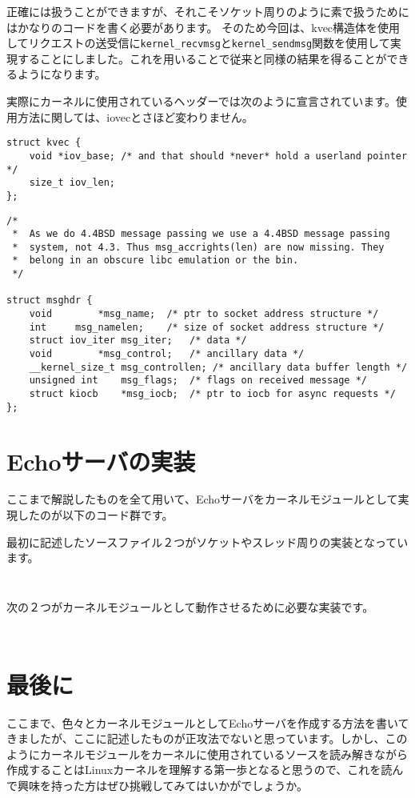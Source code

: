 正確には扱うことができますが、それこそソケット周りのように素で扱うためにはかなりのコードを書く必要があります。
そのため今回は、kvec構造体を使用してリクエストの送受信に\verb|kernel_recvmsg|と\verb|kernel_sendmsg|関数を使用して実現することにしました。これを用いることで従来と同様の結果を得ることができるようになります。

実際にカーネルに使用されているヘッダーでは次のように宣言されています。使用方法に関しては、iovecとさほど変わりません。
\begin{verbatim}
struct kvec {
    void *iov_base; /* and that should *never* hold a userland pointer */
    size_t iov_len;
};
\end{verbatim}
\begin{verbatim}
/*
 *  As we do 4.4BSD message passing we use a 4.4BSD message passing
 *  system, not 4.3. Thus msg_accrights(len) are now missing. They
 *  belong in an obscure libc emulation or the bin.
 */
 
struct msghdr {
    void        *msg_name;  /* ptr to socket address structure */
    int     msg_namelen;    /* size of socket address structure */
    struct iov_iter msg_iter;   /* data */
    void        *msg_control;   /* ancillary data */
    __kernel_size_t msg_controllen; /* ancillary data buffer length */
    unsigned int    msg_flags;  /* flags on received message */
    struct kiocb    *msg_iocb;  /* ptr to iocb for async requests */
};
\end{verbatim}

\section{Echoサーバの実装}
ここまで解説したものを全て用いて、Echoサーバをカーネルモジュールとして実現したのが以下のコード群です。

最初に記述したソースファイル２つがソケットやスレッド周りの実装となっています。
\inputminted[frame=lines,framesep=2mm,baselinestretch=1.2,fontsize=\footnotesize,linenos,breaklines]{c}{\lrfasset/echo_server.c}
\inputminted[frame=lines,framesep=2mm,baselinestretch=1.2,fontsize=\footnotesize,linenos,breaklines]{c}{\lrfasset/echo_server.h}
次の２つがカーネルモジュールとして動作させるために必要な実装です。
\inputminted[frame=lines,framesep=2mm,baselinestretch=1.2,fontsize=\footnotesize,linenos,breaklines]{c}{\lrfasset/fastecho.h}
\inputminted[frame=lines,framesep=2mm,baselinestretch=1.2,fontsize=\footnotesize,linenos,breaklines]{c}{\lrfasset/fastecho_module.c}

\section{最後に}
ここまで、色々とカーネルモジュールとしてEchoサーバを作成する方法を書いてきましたが、ここに記述したものが正攻法でないと思っています。しかし、このようにカーネルモジュールをカーネルに使用されているソースを読み解きながら作成することはLinuxカーネルを理解する第一歩となると思うので、これを読んで興味を持った方はぜひ挑戦してみてはいかがでしょうか。


